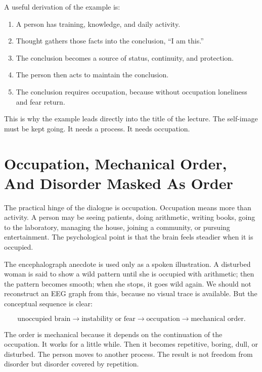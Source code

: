 A useful derivation of the example is:

\begin{enumerate}
\item A person has training, knowledge, and daily activity.
\item Thought gathers those facts into the conclusion, ``I am this.''
\item The conclusion becomes a source of status, continuity, and protection.
\item The person then acts to maintain the conclusion.
\item The conclusion requires occupation, because without occupation loneliness and fear return.
\end{enumerate}

This is why the example leads directly into the title of the lecture. The self-image must be kept going. It needs a process. It needs occupation.

\section{Occupation, Mechanical Order, And Disorder Masked As Order}

The practical hinge of the dialogue is occupation. Occupation means more than activity. A person may be seeing patients, doing arithmetic, writing books, going to the laboratory, managing the house, joining a community, or pursuing entertainment. The psychological point is that the brain feels steadier when it is occupied.

The encephalograph anecdote is used only as a spoken illustration. A disturbed woman is said to show a wild pattern until she is occupied with arithmetic; then the pattern becomes smooth; when she stops, it goes wild again. We should not reconstruct an EEG graph from this, because no visual trace is available. But the conceptual sequence is clear:

\begin{equation}
\text{unoccupied brain}
\longrightarrow
\text{instability or fear}
\longrightarrow
\text{occupation}
\longrightarrow
\text{mechanical order}.
\end{equation}

The order is mechanical because it depends on the continuation of the occupation. It works for a little while. Then it becomes repetitive, boring, dull, or disturbed. The person moves to another process. The result is not freedom from disorder but disorder covered by repetition.

